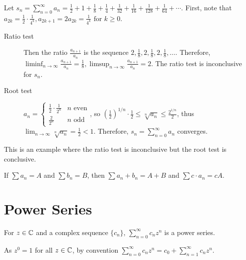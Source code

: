 \begin{example}
	\label{ex:3.35b}
	Let $s_{n}=\sum_{n=0}^{\infty}{a_{n}}=\frac{1}{2}+1+\frac{1}{8}+\frac{1}{4}+\frac{1}{32}+\frac{1}{16}+\frac{1}{128}+\frac{1}{64}+ \cdots$.
	First, note that $a_{2k}=\frac{1}{2}\cdot\frac{1}{4^{k}}, a_{2k+1}=2a_{2k}=\frac{1}{4^{k}} \text{ for } k \ge 0$.
	\begin{description}
		\item[Ratio test]
		      Then the ratio $\frac{a_{n+1}}{a_n}$ is the sequence $2, \frac{1}{8}, 2, \frac{1}{8},2, \frac{1}{8}, \ldots $. Therefore, $\liminf_{n\to \infty}{\frac{a_{n+1}}{a_{n}}}=\frac{1}{8}, \limsup_{n\to \infty}{\frac{a_{n+1}}{a_{n}}}=2$.
		      The ratio test is inconclusive for $s_{n}$.
		\item[Root test]
		      $a_{n}= \begin{cases}
				      \frac{1}{2} \cdot \frac{1}{2^{n}} & n \text{ even} \\
				      \frac{2}{2^{n}}                   & n \text{ odd}
			      \end{cases}
		      $, so $(\frac{1}{2})^{1/n}\cdot \frac{1}{2} \le  \sqrt[n]{a_{n}}\le \frac{2^{1/n}}{2}$, thus $\lim_{n\to \infty}{\sqrt[n]{a_{n}}}=\frac{1}{2}<1$. Therefore, $s_{n}=\sum_{n=0}^{\infty}{a_{n}}$ converges.
	\end{description}
	This is an example where the ratio test is inconclusive but the root test is conclusive.
\end{example}

\begin{theorem}
	\label{thm:3.47}
	If $\sum{a_{n}}=A$ and $\sum{b_{n}}=B$, then $\sum{a_{n} + b_{n}}=A+B$ and $\sum{c \cdot a_{n}}=c  A$.
\end{theorem}

\section{Power Series}
\begin{definition}
	\label{def:3.38}
	For $z \in \mathbb{C}$ and a complex sequence $\{ {c}_{n}\}$, $\sum_{n=0}^{\infty}{c_{n}z^{n}}$ is a power series.
	\begin{remark}
		As $z^{0}=1$ for all $z \in \mathbb{C}$, by convention $\sum_{n=0}^{\infty}{c_{n}z^{n}}=c_0+\sum_{n=1}^{\infty}{c_{n}z^{n}}$.
	\end{remark}
\end{definition}

